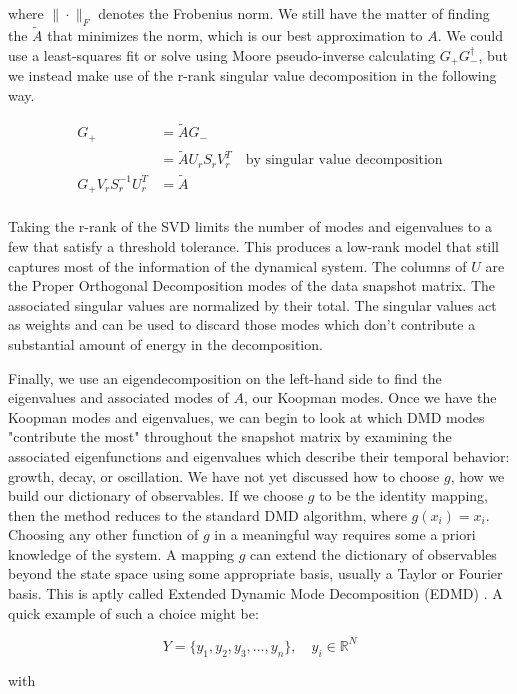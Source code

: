 \noindent where $\| \cdot \|_{F}$ denotes the Frobenius norm. We still have the matter of finding the 
${\tilde A}$ that minimizes the norm, which is our best approximation to $A$. We could
use a least-squares fit or solve using Moore pseudo-inverse calculating $G_+G^{\dagger}_-$, but we instead
 make use of the r-rank singular value decomposition in the following way.

\begin{align*}
    G_+ &= {\tilde A}G_- \\
    &= {\tilde A}U_rS_rV^{T}_r \quad \text{by singular value decomposition} \\ 
G_+ V_r S^{-1}_r U^{T}_r &= {\tilde A} \\
\end{align*}

Taking the r-rank of the SVD limits the number of modes and
 eigenvalues to a few that satisfy a threshold tolerance. This produces a low-rank model
 that still captures most of the information of the dynamical system. 
The columns of $U$ are the Proper Orthogonal Decomposition modes of the
 data snapshot matrix. The associated singular values are normalized by their total.
The singular values act as weights and can be used to discard those
 modes which don't contribute a substantial amount of energy in the decomposition.

Finally, we use an eigendecomposition on the left-hand side to find the 
eigenvalues and associated modes of $A$, our Koopman modes. Once we have the Koopman modes and eigenvalues, we can begin to look at which DMD modes
"contribute the most" throughout the snapshot matrix by examining the associated eigenfunctions and eigenvalues which describe
their temporal behavior: growth, decay, or oscillation. We have not yet
 discussed how to choose $g$, how we build our dictionary of observables. If we choose $g$ to 
be the identity mapping, then the method reduces to the standard DMD algorithm, where $g(x_i) = x_i$.
Choosing any other function of $g$ in a meaningful way requires some a priori knowledge of the system.
A mapping $g$ can extend the dictionary of observables beyond the state space using some appropriate 
basis, usually a Taylor or Fourier basis. This is aptly called Extended Dynamic Mode Decomposition (EDMD) \cite{doi:10.1137/1.9781611974508}. A quick example of such
a choice might be:

$$
Y = \{y_1, y_2, y_3, \dots, y_n  \}, \quad y_i \in \mathbb{R}^{N}
$$

\noindent with 


